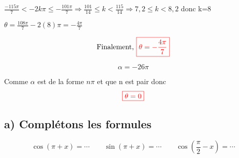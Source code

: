 \documentclass[12pt]{article}
\begin{document}
$\frac{-115\pi}{7}<-2k\pi\leq-\frac{101\pi}{7} \Rightarrow \frac{101}{14}\leq k <\frac{115}{14} \Rightarrow 7,2\leq k <8,2  $ donc k=8

$\theta=\frac{108\pi}{7}-2(8)\pi=-\frac{4\pi}{7}$ 

\[\text{Finalement, }\textcolor{red}{\boxed{\theta=-\frac{4\pi}{7}}}\]

\[\alpha =-26\pi\]

Comme $\alpha$ est de la forme $n\pi$ et que n est pair donc  \[\textcolor{red}{\boxed{\theta=0}}\]
\subsection*{a) Complétons les formules}
\[\cos(\pi+x)=\cdots\quad\quad \sin(\pi+x)=\cdots\quad\quad \cos(\frac{\pi}{2}-x)=\cdots\]
\end{document}
